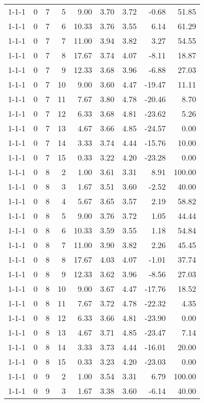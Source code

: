 \begin{tabular}{lrrrrrrrr}
1-1-1 & 0 & 7 & 5 & 9.00 & 3.70 & 3.72 & -0.68 & 51.85 \\
1-1-1 & 0 & 7 & 6 & 10.33 & 3.76 & 3.55 & 6.14 & 61.29 \\
1-1-1 & 0 & 7 & 7 & 11.00 & 3.94 & 3.82 & 3.27 & 54.55 \\
1-1-1 & 0 & 7 & 8 & 17.67 & 3.74 & 4.07 & -8.11 & 18.87 \\
1-1-1 & 0 & 7 & 9 & 12.33 & 3.68 & 3.96 & -6.88 & 27.03 \\
1-1-1 & 0 & 7 & 10 & 9.00 & 3.60 & 4.47 & -19.47 & 11.11 \\
1-1-1 & 0 & 7 & 11 & 7.67 & 3.80 & 4.78 & -20.46 & 8.70 \\
1-1-1 & 0 & 7 & 12 & 6.33 & 3.68 & 4.81 & -23.62 & 5.26 \\
1-1-1 & 0 & 7 & 13 & 4.67 & 3.66 & 4.85 & -24.57 & 0.00 \\
1-1-1 & 0 & 7 & 14 & 3.33 & 3.74 & 4.44 & -15.76 & 10.00 \\
1-1-1 & 0 & 7 & 15 & 0.33 & 3.22 & 4.20 & -23.28 & 0.00 \\
1-1-1 & 0 & 8 & 2 & 1.00 & 3.61 & 3.31 & 8.91 & 100.00 \\
1-1-1 & 0 & 8 & 3 & 1.67 & 3.51 & 3.60 & -2.52 & 40.00 \\
1-1-1 & 0 & 8 & 4 & 5.67 & 3.65 & 3.57 & 2.19 & 58.82 \\
1-1-1 & 0 & 8 & 5 & 9.00 & 3.76 & 3.72 & 1.05 & 44.44 \\
1-1-1 & 0 & 8 & 6 & 10.33 & 3.59 & 3.55 & 1.18 & 54.84 \\
1-1-1 & 0 & 8 & 7 & 11.00 & 3.90 & 3.82 & 2.26 & 45.45 \\
1-1-1 & 0 & 8 & 8 & 17.67 & 4.03 & 4.07 & -1.01 & 37.74 \\
1-1-1 & 0 & 8 & 9 & 12.33 & 3.62 & 3.96 & -8.56 & 27.03 \\
1-1-1 & 0 & 8 & 10 & 9.00 & 3.67 & 4.47 & -17.76 & 18.52 \\
1-1-1 & 0 & 8 & 11 & 7.67 & 3.72 & 4.78 & -22.32 & 4.35 \\
1-1-1 & 0 & 8 & 12 & 6.33 & 3.66 & 4.81 & -23.90 & 0.00 \\
1-1-1 & 0 & 8 & 13 & 4.67 & 3.71 & 4.85 & -23.47 & 7.14 \\
1-1-1 & 0 & 8 & 14 & 3.33 & 3.73 & 4.44 & -16.01 & 20.00 \\
1-1-1 & 0 & 8 & 15 & 0.33 & 3.23 & 4.20 & -23.03 & 0.00 \\
1-1-1 & 0 & 9 & 2 & 1.00 & 3.54 & 3.31 & 6.79 & 100.00 \\
1-1-1 & 0 & 9 & 3 & 1.67 & 3.38 & 3.60 & -6.14 & 40.00 \\

\end{tabular}
